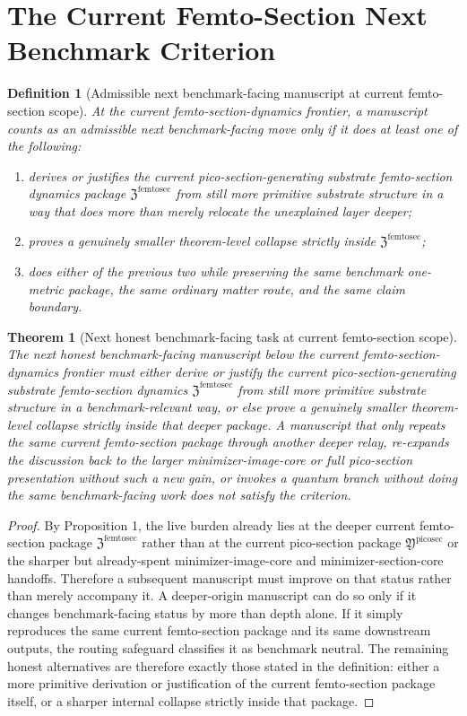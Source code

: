 \documentclass[11pt]{article}
\newcommand{\PicoSectionPackage}{\mathfrak Y^{\mathrm{picosec}}}
\newcommand{\FemtoSectionPackage}{\mathfrak Z^{\mathrm{femtosec}}}
\newtheorem{definition}{Definition}
\newtheorem{theorem}{Theorem}
\begin{document}
\section{The Current Femto-Section Next Benchmark Criterion}

\begin{definition}[Admissible next benchmark-facing manuscript at current femto-section scope]
At the current femto-section-dynamics frontier, a manuscript counts as an admissible next benchmark-facing move only if it does at least one of the following:
\begin{enumerate}
    \item derives or justifies the current pico-section-generating substrate femto-section dynamics package \(\FemtoSectionPackage\) from still more primitive substrate structure in a way that does more than merely relocate the unexplained layer deeper;
    \item proves a genuinely smaller theorem-level collapse strictly inside \(\FemtoSectionPackage\);
    \item does either of the previous two while preserving the same benchmark one-metric package, the same ordinary matter route, and the same claim boundary.
\end{enumerate}
\end{definition}

\begin{theorem}[Next honest benchmark-facing task at current femto-section scope]
The next honest benchmark-facing manuscript below the current femto-section-dynamics frontier must either derive or justify the current pico-section-generating substrate femto-section dynamics \(\FemtoSectionPackage\) from still more primitive substrate structure in a benchmark-relevant way, or else prove a genuinely smaller theorem-level collapse strictly inside that deeper package. A manuscript that only repeats the same current femto-section package through another deeper relay, re-expands the discussion back to the larger minimizer-image-core or full pico-section presentation without such a new gain, or invokes a quantum branch without doing the same benchmark-facing work does not satisfy the criterion.
\end{theorem}

\begin{proof}
By Proposition 1, the live burden already lies at the deeper current femto-section package \(\FemtoSectionPackage\) rather than at the current pico-section package \(\PicoSectionPackage\) or the sharper but already-spent minimizer-image-core and minimizer-section-core handoffs. Therefore a subsequent manuscript must improve on that status rather than merely accompany it. A deeper-origin manuscript can do so only if it changes benchmark-facing status by more than depth alone. If it simply reproduces the same current femto-section package and its same downstream outputs, the routing safeguard classifies it as benchmark neutral. The remaining honest alternatives are therefore exactly those stated in the definition: either a more primitive derivation or justification of the current femto-section package itself, or a sharper internal collapse strictly inside that package.
\end{proof}
\end{document}
